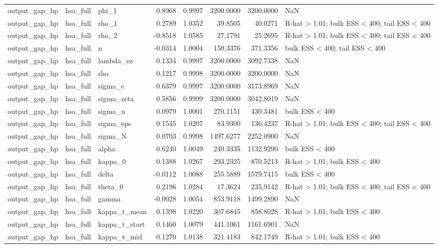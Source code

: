 \begin{tabular}{lllrrrrl}
output\_gap\_hp & hsa\_full & phi\_1 & 0.8968 & 0.9997 & 3200.0000 & 3200.0000 & NaN \\
output\_gap\_hp & hsa\_full & rho\_1 & 0.2789 & 1.0352 & 39.8505 & 40.0271 & R-hat > 1.01; bulk ESS < 400; tail ESS < 400 \\
output\_gap\_hp & hsa\_full & rho\_2 & -0.8518 & 1.0585 & 27.1791 & 25.2695 & R-hat > 1.01; bulk ESS < 400; tail ESS < 400 \\
output\_gap\_hp & hsa\_full & n & -0.0314 & 1.0004 & 150.3376 & 371.3356 & bulk ESS < 400; tail ESS < 400 \\
output\_gap\_hp & hsa\_full & lambda\_ez & 0.1334 & 0.9997 & 3200.0000 & 3092.7338 & NaN \\
output\_gap\_hp & hsa\_full & rho & 0.1217 & 0.9998 & 3200.0000 & 3200.0000 & NaN \\
output\_gap\_hp & hsa\_full & sigma\_e & 0.6379 & 0.9997 & 3200.0000 & 3173.8969 & NaN \\
output\_gap\_hp & hsa\_full & sigma\_zeta & 0.5856 & 0.9999 & 3200.0000 & 3042.8019 & NaN \\
output\_gap\_hp & hsa\_full & sigma\_u & 0.0979 & 1.0001 & 270.1151 & 430.3481 & bulk ESS < 400 \\
output\_gap\_hp & hsa\_full & sigma\_eps & 0.1545 & 1.0207 & 83.9300 & 136.4237 & R-hat > 1.01; bulk ESS < 400; tail ESS < 400 \\
output\_gap\_hp & hsa\_full & sigma\_N & 0.0703 & 0.9998 & 1497.6277 & 2252.0900 & NaN \\
output\_gap\_hp & hsa\_full & alpha & 0.6240 & 1.0049 & 240.3335 & 1132.9290 & bulk ESS < 400 \\
output\_gap\_hp & hsa\_full & kappa\_0 & 0.1388 & 1.0267 & 293.2325 & 870.5213 & R-hat > 1.01; bulk ESS < 400 \\
output\_gap\_hp & hsa\_full & delta & -0.0112 & 1.0088 & 255.5889 & 1579.7415 & bulk ESS < 400 \\
output\_gap\_hp & hsa\_full & theta\_0 & 0.2196 & 1.0284 & 17.3624 & 235.9142 & R-hat > 1.01; bulk ESS < 400; tail ESS < 400 \\
output\_gap\_hp & hsa\_full & gamma & -0.0028 & 1.0054 & 853.9118 & 1499.2890 & NaN \\
output\_gap\_hp & hsa\_full & kappa\_t\_mean & 0.1398 & 1.0220 & 307.6845 & 858.8028 & R-hat > 1.01; bulk ESS < 400 \\
output\_gap\_hp & hsa\_full & kappa\_t\_start & 0.1460 & 1.0079 & 441.1061 & 1161.6901 & NaN \\
output\_gap\_hp & hsa\_full & kappa\_t\_mid & 0.1270 & 1.0138 & 321.4183 & 842.1749 & R-hat > 1.01; bulk ESS < 400 \\

\end{tabular}
